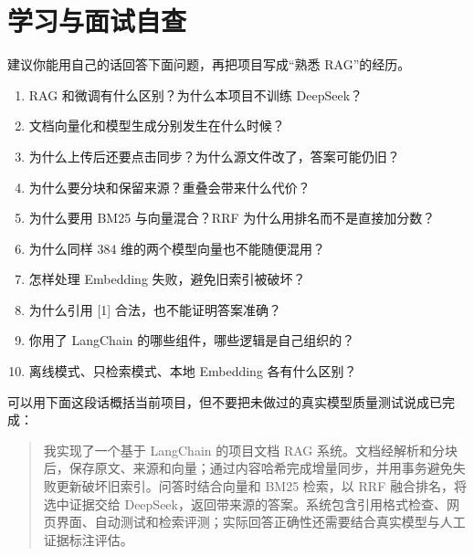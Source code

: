 \documentclass[UTF8,11pt,a4paper,fontset=fandol]{ctexart}
\begin{document}
\section{学习与面试自查}
建议你能用自己的话回答下面问题，再把项目写成“熟悉 RAG”的经历。
\begin{enumerate}
\item RAG 和微调有什么区别？为什么本项目不训练 DeepSeek？
\item 文档向量化和模型生成分别发生在什么时候？
\item 为什么上传后还要点击同步？为什么源文件改了，答案可能仍旧？
\item 为什么要分块和保留来源？重叠会带来什么代价？
\item 为什么要用 BM25 与向量混合？RRF 为什么用排名而不是直接加分数？
\item 为什么同样 384 维的两个模型向量也不能随便混用？
\item 怎样处理 Embedding 失败，避免旧索引被破坏？
\item 为什么引用 [1] 合法，也不能证明答案准确？
\item 你用了 LangChain 的哪些组件，哪些逻辑是自己组织的？
\item 离线模式、只检索模式、本地 Embedding 各有什么区别？
\end{enumerate}

可以用下面这段话概括当前项目，但不要把未做过的真实模型质量测试说成已完成：

\begin{quote}
我实现了一个基于 LangChain 的项目文档 RAG 系统。文档经解析和分块后，保存原文、来源和向量；通过内容哈希完成增量同步，并用事务避免失败更新破坏旧索引。问答时结合向量和 BM25 检索，以 RRF 融合排名，将选中证据交给 DeepSeek，返回带来源的答案。系统包含引用格式检查、网页界面、自动测试和检索评测；实际回答正确性还需要结合真实模型与人工证据标注评估。
\end{quote}

\appendix
\end{document}
